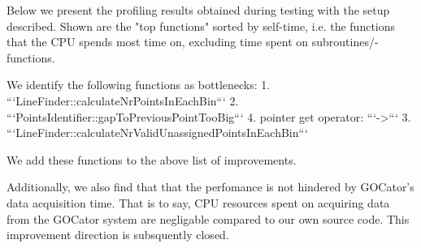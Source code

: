 Below we present the profiling results obtained during testing with the setup described. Shown are the "top functions" sorted by self-time, i.e. the functions that the CPU spends most time on, excluding time spent on subroutines/-functions.





We identify the following functions as bottlenecks:
1. ```LineFinder::calculateNrPointsInEachBin```
2. ```PointsIdentifier::gapToPreviousPointTooBig```
4. pointer get operator:  ```->```
3. ```LineFinder::calculateNrValidUnassignedPointsInEachBin```

We add these functions to the above list of improvements.

Additionally, we also find that that the perfomance is not hindered by GOCator's data acquisition time. That is to say, CPU resources spent on acquiring data from the GOCator system are negligable compared to our own source code. This improvement direction is subsquently closed.